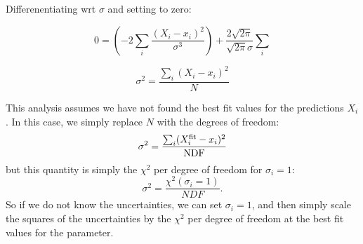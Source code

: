 \documentclass[12pt,oneside]{book}
\begin{document}
Differenentiating wrt $\sigma$ and setting to zero:

\begin{equation}
0 = \left( - 2 \sum_i \frac{(X_i-x_i)^2}{\sigma^3} \right)+\frac{2\sqrt{2\pi}}{\sqrt{2\pi}\sigma}\sum_i 
\end{equation}

\begin{equation}
\sigma^2 = \frac{\sum_i (X_i-x_i)^2}{N} 
\end{equation}

This analysis assumes we have not found the best fit values for the predictions $X_i$.  In this case, we simply replace $N$ with the degrees of freedom:
\begin{displaymath}
\sigma^2 = \frac{\sum_i (X_i^{\rm fit}-x_i)^2}{\rm NDF}
\end{displaymath}
but this quantity is simply the $\chi^2$ per degree of freedom for $\sigma_i = 1$:
\begin{displaymath}
\sigma^2 = \frac{\chi^2(\sigma_i = 1)}{NDF}.
\end{displaymath}
So if we do not know the uncertainties, we can set $\sigma_i = 1$, and then simply scale the squares of the uncertainties by the $\chi^2$ per degree of freedom at the best fit values for the parameter.  
\end{document}
